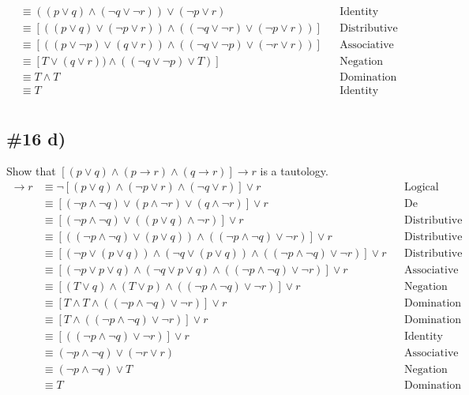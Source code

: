 \documentclass{article}
\newcommand{\problem}[1]{\subsection{\##1}}
\renewcommand{\And}{\wedge}
\newcommand{\Or}{\vee}
\begin{document}
\begin{align*}
    &\equiv ((p \Or q) \And (\neg q \Or \neg r)) \Or (\neg p \Or r) && \text{Identity Law.}\\
    &\equiv [((p \Or q) \Or (\neg p \Or r)) \And ((\neg q \Or \neg r) \Or (\neg p \Or r))] && \text{Distributive Law.}\\
    &\equiv [((p \Or \neg p) \Or (q \Or r)) \And ((\neg q \Or \neg p) \Or (\neg r \Or r))] && \text{Associative Law.}\\
    &\equiv [T \Or (q \Or r)) \And ((\neg q \Or \neg p) \Or T)] && \text{Negation Law.}\\
    &\equiv T \And T && \text{Domination Law.}\\
    &\equiv T && \text{Identity Law.}\\
\end{align*}
\pagebreak
\problem{16 d)}
Show that \([(p \Or q) \And (p \rightarrow r) \And (q \rightarrow r)] \rightarrow r\) is a tautology.
\begin{align*}
    [(p \Or q) \And (p \rightarrow r) \And (q \rightarrow r)] \rightarrow r &\equiv \neg[(p \Or q) \And (\neg p \Or r) \And (\neg q \Or r )] \Or r &&\text{Logical equivalence.}\\
    &\equiv[(\neg p \And \neg q) \Or (p \And \neg r) \Or (q \And \neg r)] \Or r &&\text{De Morgan's Law.}\\
    &\equiv[(\neg p  \And \neg q) \Or ((p \Or q) \And \neg r)] \Or r &&\text{Distributive Law.}\\
    &\equiv[((\neg p \And \neg q) \Or (p \Or q))\And ((\neg p \And \neg q) \Or \neg r)] \Or r &&\text{Distributive Law.}\\
    &\equiv[(\neg p \Or (p \Or q)) \And (\neg q \Or (p \Or q)) \And ((\neg p \And \neg q) \Or \neg r)] \Or r &&\text{Distributive Law.}\\
    &\equiv[(\neg p \Or p \Or q) \And (\neg q \Or p \Or q) \And ((\neg p \And \neg q) \Or \neg r)] \Or r &&\text{Associative Law.}\\
    &\equiv[(T \Or q) \And (T \Or p) \And ((\neg p \And \neg q) \Or \neg r)] \Or r &&\text{Negation Law.}\\
    &\equiv[T \And T \And ((\neg p \And \neg q) \Or \neg r)] \Or r &&\text{Domination Law.}\\
    &\equiv[T \And ((\neg p \And \neg q) \Or \neg r)] \Or r &&\text{Domination Law.}\\
    &\equiv[((\neg p \And \neg q) \Or \neg r)] \Or r &&\text{Identity Law.}\\
    &\equiv(\neg p \And \neg q) \Or (\neg r \Or r) &&\text{Associative Law.}\\
    &\equiv(\neg p \And \neg q) \Or T &&\text{Negation Law.}\\
    &\equiv T &&\text{Domination Law.}\\
\end{align*}
\end{document}
